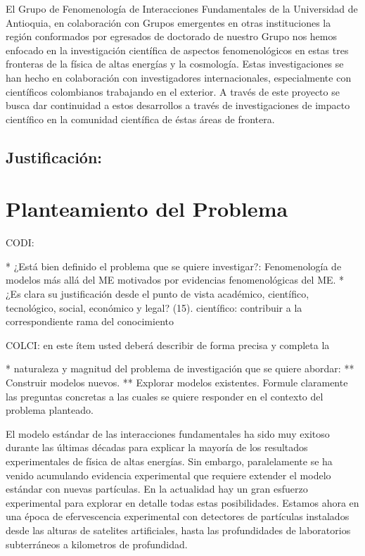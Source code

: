 El Grupo de Fenomenología de Interacciones Fundamentales de la
Universidad de Antioquia, en colaboración con Grupos emergentes en
otras instituciones la región conformados por egresados de doctorado
de nuestro Grupo nos hemos enfocado en la investigación científica de
aspectos fenomenológicos en estas tres fronteras de la física de altas
energías y la cosmología. Estas investigaciones se han hecho en
colaboración con investigadores internacionales, especialmente con
científicos colombianos trabajando en el exterior. A través de este
proyecto se busca dar continuidad a estos desarrollos a través de
investigaciones de impacto científico en la comunidad científica de
éstas áreas de frontera.

\subsection{Justificación:                                 }
\section{Planteamiento del Problema }
\begin{instrucciones}
  CODI: 

  * ¿Está bien definido el problema que se quiere investigar?:
  Fenomenología de modelos más allá del ME motivados por evidencias
  fenomenológicas del ME.  
  * ¿Es clara su justificación desde el punto de vista académico,
  científico, tecnológico, social, económico y legal? (15).
  científico: contribuir a la correspondiente rama del conocimiento

  COLCI: en este ítem usted deberá describir de forma precisa y completa la
  
  * naturaleza y magnitud del problema de investigación que se quiere
  abordar:
  ** Construir modelos nuevos.
  ** Explorar modelos existentes.
  Formule claramente las preguntas concretas a las cuales se
  quiere responder en el contexto del problema planteado.
\end{instrucciones}
El modelo estándar de las interacciones fundamentales ha sido muy
exitoso durante las últimas décadas para explicar la mayoría de los
resultados experimentales de física de altas energías. Sin embargo,
paralelamente se ha venido acumulando evidencia experimental que
requiere extender el modelo estándar con nuevas partículas. En la
actualidad hay un gran esfuerzo experimental para explorar en detalle
todas estas posibilidades. Estamos ahora en una época de efervescencia
experimental con detectores de partículas instalados desde las alturas
de satelites artificiales, hasta las profundidades de laboratorios
subterráneos a kilometros de profundidad.

